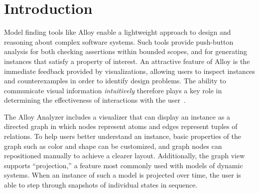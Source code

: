 \documentclass[runningheads]{llncs}
\begin{document}


\section{Introduction}
\label{introduction}

Model finding tools like Alloy enable a lightweight approach to design and reasoning about complex software systems. Such tools provide push-button analysis for both checking assertions within bounded scopes, and for generating instances that satisfy a property of interest. An attractive feature of Alloy is the immediate feedback provided by visualizations, allowing users to inspect instances and counterexamples in order to identify design problems. The ability to communicate visual information \emph{intuitively} therefore plays a key role in determining the effectiveness of interactions with the user~\cite{gammaitoni2014}.

The Alloy Analyzer includes a visualizer that can display an instance as a directed graph in which nodes represent atoms and edges represent tuples of relations.
To help users better understand an instance, basic properties of the graph such as color and shape can be customized, and graph nodes can repositioned manually to achieve a clearer layout.
Additionally, the graph view supports ``projection,'' a feature most commonly used with models of dynamic systems. 
When an instance of such a model is projected over time, the user is able to step through snapshots of individual states in sequence.
\end{document}
